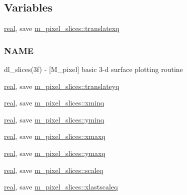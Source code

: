 \subsection*{Variables}
\begin{DoxyCompactItemize}
\item 
\hyperlink{read__watch_83_8txt_abdb62bde002f38ef75f810d3a905a823}{real}, save \hyperlink{namespacem__pixel__slices_a984b384660455b08f81e6ba889c4f181}{m\+\_\+pixel\+\_\+slices\+::translatexq}
\begin{DoxyCompactList}\small\item\em \subsubsection*{N\+A\+ME}

dl\+\_\+slices(3f) -\/ \mbox{[}M\+\_\+pixel\mbox{]} basic 3-\/d surface plotting routine \end{DoxyCompactList}\item 
\hyperlink{read__watch_83_8txt_abdb62bde002f38ef75f810d3a905a823}{real}, save \hyperlink{namespacem__pixel__slices_ac0ed11bf15d4d4bf8a97194d64035b02}{m\+\_\+pixel\+\_\+slices\+::translateyq}
\item 
\hyperlink{read__watch_83_8txt_abdb62bde002f38ef75f810d3a905a823}{real}, save \hyperlink{namespacem__pixel__slices_a982eea046c0a07e9767fac51b96e9c5b}{m\+\_\+pixel\+\_\+slices\+::xminq}
\item 
\hyperlink{read__watch_83_8txt_abdb62bde002f38ef75f810d3a905a823}{real}, save \hyperlink{namespacem__pixel__slices_afc89e60a080837a7d23abc70409bcde7}{m\+\_\+pixel\+\_\+slices\+::yminq}
\item 
\hyperlink{read__watch_83_8txt_abdb62bde002f38ef75f810d3a905a823}{real}, save \hyperlink{namespacem__pixel__slices_a72480fe0bf407c578fb6c6c01b929447}{m\+\_\+pixel\+\_\+slices\+::xmaxq}
\item 
\hyperlink{read__watch_83_8txt_abdb62bde002f38ef75f810d3a905a823}{real}, save \hyperlink{namespacem__pixel__slices_a9f789eabf3f49da6fdd6c713642836c5}{m\+\_\+pixel\+\_\+slices\+::ymaxq}
\item 
\hyperlink{read__watch_83_8txt_abdb62bde002f38ef75f810d3a905a823}{real}, save \hyperlink{namespacem__pixel__slices_a560f9a31fb656d89f985a6bb0c00d815}{m\+\_\+pixel\+\_\+slices\+::scaleq}
\item 
\hyperlink{read__watch_83_8txt_abdb62bde002f38ef75f810d3a905a823}{real}, save \hyperlink{namespacem__pixel__slices_ae99e40f4f0b19ff8415ac84db8532f0d}{m\+\_\+pixel\+\_\+slices\+::xlastscaleq}

\end{DoxyCompactItemize}
